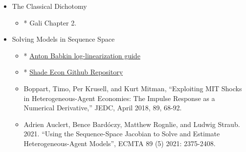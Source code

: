 \documentclass[12pt]{article}
\begin{document}
\begin{itemize}
	\item The Classical Dichotomy
	\begin{itemize}
		\item* Gali Chapter 2.
	\end{itemize}
	\item Solving Models in Sequence Space
	\begin{itemize}
		\item* \href{https://www.antonbabkin.com/econ714/log-lin_sims.pdf}{Anton Babkin log-linearization guide}
		\item* \href{https://github.com/shade-econ/sequence-jacobian/blob/master/notebooks/rbc.ipynb}{Shade Econ Github Repository}
		\item Boppart, Timo, Per Krusell, and Kurt Mitman, ``Exploiting MIT Shocks in Heterogeneous-Agent Economies: The Impulse Response as a Numerical Derivative,'' JEDC, April 2018, 89, 68-92.
		\item Adrien Auclert, Bence Bard{\'o}czy, Matthew Rognlie, and Ludwig Straub. 2021. ``Using the Sequence-Space Jacobian to Solve and Estimate Heterogeneous-Agent Models'', ECMTA 89 (5) 2021: 2375-2408.

\end{itemize}
\end{itemize}
\end{document}
